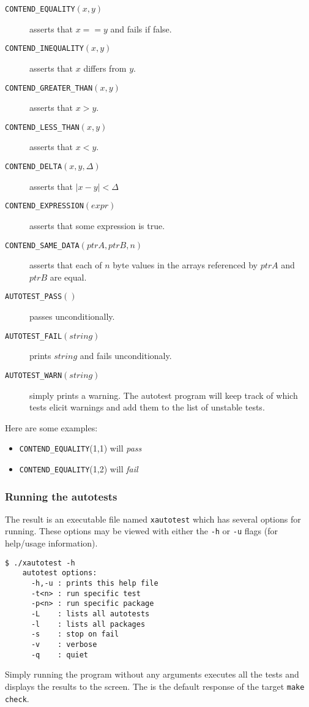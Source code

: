 \begin{description}
\item[{\tt CONTEND\_EQUALITY}$(x,y)$] asserts that $x==y$ and fails if
false.
\item[{\tt CONTEND\_INEQUALITY}$(x,y)$] asserts that $x$ differs from
$y$.
\item[{\tt CONTEND\_GREATER\_THAN}$(x,y)$] asserts that $x>y$.
\item[{\tt CONTEND\_LESS\_THAN}$(x,y)$] asserts that $x<y$.
\item[{\tt CONTEND\_DELTA}$(x,y,\Delta)$] asserts that $|x-y|<\Delta$
\item[{\tt CONTEND\_EXPRESSION}$(expr)$] asserts that some expression is
true.
\item[{\tt CONTEND\_SAME\_DATA}$(ptrA,ptrB,n)$] asserts that each of $n$
byte values in the arrays referenced by $ptrA$ and $ptrB$ are equal.
\item[{\tt AUTOTEST\_PASS}$()$] passes unconditionally.
\item[{\tt AUTOTEST\_FAIL}$(string)$] prints $string$ and fails
unconditionaly.
\item[{\tt AUTOTEST\_WARN}$(string)$] simply prints a warning.
The autotest program will keep track of which tests elicit warnings and add
them to the list of unstable tests.
\end{description}

Here are some examples:
\begin{itemize}
\item[] {\tt CONTEND\_EQUALITY}(1,1) will {\it pass}
\item[] {\tt CONTEND\_EQUALITY}(1,2) will {\it fail}
\end{itemize}

\subsubsection{Running the autotests}
The result is an executable file named {\tt xautotest} which has several
options for running.
These options may be viewed with either the {\tt -h} or {\tt -u} flags (for
help/usage information).
%
\begin{Verbatim}[fontsize=\small]
    $ ./xautotest -h
    autotest options:
      -h,-u : prints this help file
      -t<n> : run specific test
      -p<n> : run specific package
      -L    : lists all autotests
      -l    : lists all packages
      -s    : stop on fail
      -v    : verbose
      -q    : quiet
\end{Verbatim}
%
Simply running the program without any arguments executes all the tests and
displays the results to the screen.
The is the default response of the target {\tt make check}.

